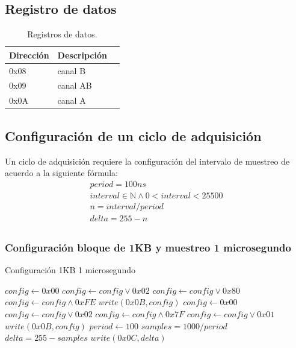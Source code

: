 \subsection{Registro de datos}

\begin{table}[ht]
    \centering
    \begin{tabular}{|l|l|l|}
    \hline
    Direcci\'on & Descripci\'on \\
    \hline
     0x08 & canal B\\ 
    \hline
     0x09 & canal AB\\
     \hline
     0x0A & canal A\\
     \hline
\end{tabular}
\caption{\label{tab:registros_ad_datos}Registros de datos.}
\end{table}


\subsection{Configuraci\'on de un ciclo de adquisici\'on}

Un ciclo de adquisici\'on requiere la configuraci\'on del intervalo de muestreo
de acuerdo a la siguiente f\'ormula:
\begin{gather}
period = 100 ns\\
interval \in \mathbb{N} \land 0 < interval < 25500\\
n = interval / period\\
delta  = 255 - n\\
\end{gather}

\subsubsection{Configuraci\'on bloque de 1KB y muestreo 1 microsegundo}

\begin{algorithm}
    \caption{Configuraci\'on 1KB 1 microsegundo}\label{algo_ad_conf}
    \begin{algorithmic}[1]
    \State
    \State $config \gets 0x00$
    \State $config \gets config \lor 0x02$
    \State $config \gets config \lor 0x80$
    \State $config \gets config \land 0xFE$
    \State $write(0x0B, config)$
    \State
    \State $config \gets 0x00$
    \State $config \gets config \lor 0x02$
    \State $config \gets config \land 0x7F$
    \State $config \gets config \lor 0x01$
    \State $write(0x0B, config)$
    \State
    \State $period \gets 100$
    \State $samples= 1000 / period$
    \State $delta = 255 - samples$
    \State $write(0x0C, delta)$

    \EndProcedure
    \end{algorithmic}
    \end{algorithm}
    \newpage
